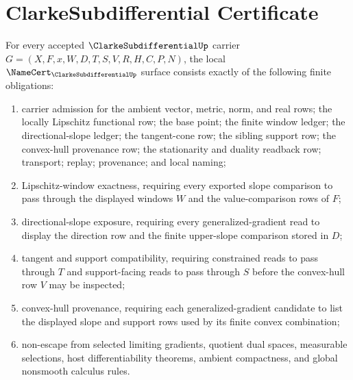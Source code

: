 \section{ClarkeSubdifferential Certificate}
\label{sec:clarke-subdifferential-certificate}

\begin{theorem}
\label{thm:clarke-subdifferential-namecert-obligations}
For every accepted $\ClarkeSubdifferentialUp$ carrier $G=(X,F,x,W,D,T,S,V,R,H,C,P,N)$, the local $\NameCert_{\ClarkeSubdifferentialUp}$ surface consists exactly of the following finite obligations:
\begin{enumerate}
\item carrier admission for the ambient vector, metric, norm, and real rows; the locally Lipschitz functional row; the base point; the finite window ledger; the directional-slope ledger; the tangent-cone row; the sibling support row; the convex-hull provenance row; the stationarity and duality readback row; transport; replay; provenance; and local naming;
\item Lipschitz-window exactness, requiring every exported slope comparison to pass through the displayed windows $W$ and the value-comparison rows of $F$;
\item directional-slope exposure, requiring every generalized-gradient read to display the direction row and the finite upper-slope comparison stored in $D$;
\item tangent and support compatibility, requiring constrained reads to pass through $T$ and support-facing reads to pass through $S$ before the convex-hull row $V$ may be inspected;
\item convex-hull provenance, requiring each generalized-gradient candidate to list the displayed slope and support rows used by its finite convex combination;
\item non-escape from selected limiting gradients, quotient dual spaces, measurable selections, host differentiability theorems, ambient compactness, and global nonsmooth calculus rules.
\end{enumerate}
\end{theorem}
